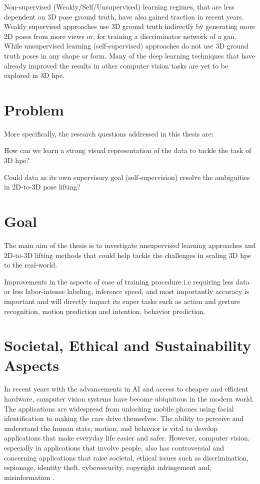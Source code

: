 Non-supervised (Weakly/Self/Unsupervised) learning regimes, that are less dependent on 3D pose ground truth, have also gained traction in recent years. Weakly supervised approaches use 3D ground truth indirectly by generating more 2D poses from more views or, for training a discriminator network of a \ac{gan}. While unsupervised learning (self-supervised) approaches do not use 3D ground truth poses in any shape or form. Many of the deep learning techniques that have already improved the results in other computer vision tasks are yet to be explored in 3D \ac{hpe}. 

\section{Problem}
\label{sec:problem}
More specifically, the research questions addressed in this thesis are: 
\begin{compactenum}
\item How can we learn a strong visual representation of the data to tackle the task of 3D \ac{hpe}?
\item Could data as its own supervisory goal (self-supervision) resolve the ambiguities in 2D-to-3D pose lifting?
\end{compactenum}

\section{Goal}
\label{sec:goal}
The main aim of the thesis is to investigate unsupervised learning approaches and 2D-to-3D lifting methods that could help tackle the challenges in scaling 3D \ac{hpe} to the real-world.

Improvements in the aspects of ease of training procedure i.e requiring less data or less labor-intense labeling, inference speed, and most importantly accuracy is important and will directly impact its super tasks such as action and gesture recognition, motion prediction and intention, behavior prediction.

\section{Societal, Ethical and Sustainability Aspects}
In recent years with the advancements in AI and access to cheaper and efficient hardware, computer vision systems have become ubiquitous in the modern world. The applications are widespread from unlocking mobile phones using facial identification to making the cars drive themselves. The ability to perceive and understand the human state, motion, and behavior is vital to develop applications that make everyday life easier and safer. However, computer vision, especially in applications that involve people, also has controversial and concerning applications that raise societal, ethical issues such as discrimination, espionage, identity theft, cybersecurity, copyright infringement and, misinformation \cite{ethical_issues}.

